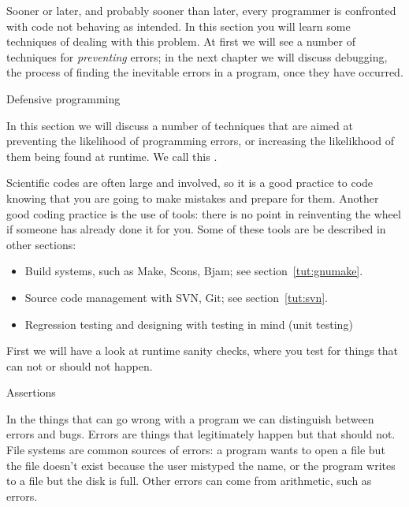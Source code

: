
Sooner or later, and probably sooner than later, every programmer is
confronted with code not behaving as intended. In this section you
will learn some techniques of dealing with this problem. At first we
will see a number of techniques for \emph{preventing} errors; 
in the next chapter we will discuss debugging, the process of
finding the inevitable errors in a program, once they have occurred.

 {Defensive programming}

In this section we will discuss a number of  techniques
that are aimed at preventing the likelihood of programming errors, or
increasing the likelikhood of them being found at runtime.
We call this  . 

Scientific codes are often large and involved, so it
is a good practice to code knowing that you are going to make mistakes
and prepare for them. Another good coding practice is the use of
tools: there is no point in reinventing the wheel if someone has
already done it for you. Some of these tools are be described in
other sections:
\begin{itemize}
\item Build systems, such as Make, Scons, Bjam; see section~\ref{tut:gnumake}.
\item Source code management with SVN, Git; see section~\ref{tut:svn}.
\item Regression testing and designing with testing in mind (unit testing)
\end{itemize}

First we will have a look at runtime sanity checks, where you test 
for things that can not or should not
happen. 

 {Assertions}

In the things that can go wrong with a program we can distinguish between
errors and bugs. Errors are things that legitimately happen but that should
not. File systems are common sources of errors: a program wants to open a file but
the file doesn't exist because the user mistyped the name, or the program
writes to a file but the disk is full. Other errors can come from arithmetic,
such as  errors.

